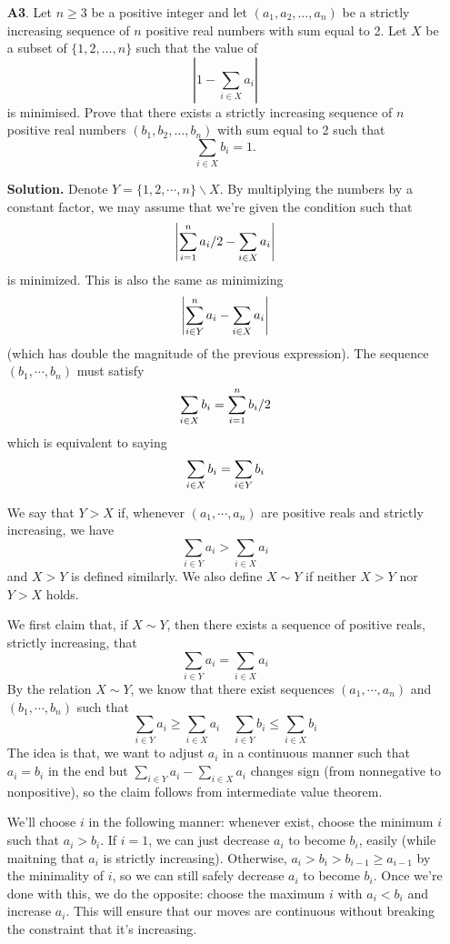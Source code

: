 \documentclass[11pt,a4paper]{article}
\begin{document}
\begin{enumerate}
	\item [\textbf{A3}.] Let $n \geqslant 3$ be a positive integer and let $\left(a_{1}, a_{2}, \ldots, a_{n}\right)$ be a strictly increasing sequence of $n$ positive real numbers with sum equal to 2. Let $X$ be a subset of $\{1,2, \ldots, n\}$ such that the value of
	\[
	\left|1-\sum_{i \in X} a_{i}\right|
	\]is minimised. Prove that there exists a strictly increasing sequence of $n$ positive real numbers $\left(b_{1}, b_{2}, \ldots, b_{n}\right)$ with sum equal to 2 such that
	\[
	\sum_{i \in X} b_{i}=1.
	\]
	
	\textbf{Solution.} 
	Denote $Y=\{1, 2, \cdots , n\}\backslash X$.
	By multiplying the numbers by a constant factor, we may assume that we're given the condition such that \[
	\left|\displaystyle\sum_{i=1}^n a_i/2-\sum_{i \in X} a_{i}\right|
	\]
	is minimized. This is also the same as minimizing 
	\[
	\left|\displaystyle\sum_{i\in Y}^n a_i-\sum_{i \in X} a_{i}\right|
	\]
	(which has double the magnitude of the previous expression). 
	The sequence $(b_1, \cdots , b_n)$ must satisfy 
	\[
	\displaystyle\sum_{i\in X}b_i = \displaystyle\sum_{i=1}^n b_i/2
	\]
	which is equivalent to saying 
	\[
	\displaystyle\sum_{i\in X}b_i = \displaystyle\sum_{i\in Y}b_i 
	\]
	
	We say that $Y>X$ if, whenever $(a_1, \cdots, a_n)$ are positive reals and strictly increasing, we have 
	\[
	\sum_{i \in Y} a_{i} > \sum_{i \in X} a_{i}
	\]
	and $X>Y$ is defined similarly. We also define $X\sim Y$ if neither $X>Y$ nor $Y>X$ holds. 
	
	We first claim that, if $X\sim Y$, then there exists a sequence of positive reals, strictly increasing, that 
	\[
	\sum_{i \in Y} a_{i} = \sum_{i \in X} a_{i}
	\]
	By the relation $X\sim Y$, we know that there exist sequences $(a_1, \cdots, a_n)$ and $(b_1, \cdots , b_n)$ such that 
	\[
	\sum_{i \in Y} a_{i} \ge \sum_{i \in X} a_{i}
	\quad
	\sum_{i \in Y} b_{i} \le \sum_{i \in X} b_{i}
	\]
	The idea is that, we want to adjust $a_i$ in a continuous manner such that $a_i=b_i$ in the end but $\sum_{i \in Y} a_{i} - \sum_{i \in X} a_{i}$ changes sign (from nonnegative to nonpositive), so the claim follows from intermediate value theorem. 
	
	We'll choose $i$ in the following manner: whenever exist, choose the minimum $i$ such that $a_i>b_i$. If $i=1$, we can just decrease $a_i$ to become $b_i$, easily (while maitning that $a_i$ is strictly increasing). Otherwise, $a_i>b_i>b_{i-1}\ge a_{i-1}$ by the minimality of $i$, so we can still safely decrease $a_i$ to become $b_i$. Once we're done with this, we do the opposite: choose the maximum $i$ with $a_i<b_i$ and increase $a_i$. This will ensure that our moves are continuous without breaking the constraint that it's increasing. 
	

\end{enumerate}
\end{document}
